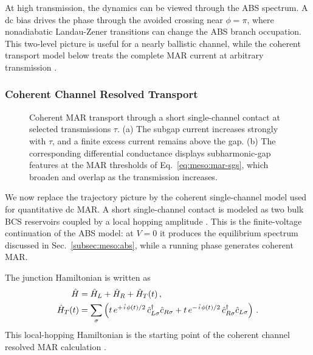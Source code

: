         At high transmission, the dynamics can be viewed through the ABS spectrum. A dc bias drives the phase through the avoided crossing near $\phi=\pi$, where nonadiabatic Landau-Zener transitions can change the ABS branch occupation. This two-level picture is useful for a nearly ballistic channel, while the coherent transport model below treats the complete MAR current at arbitrary transmission \cite{averin_ac_1995}.

        \subsubsection*{Coherent Channel Resolved Transport}

            \begin{figure}[t]
                \centering
                \hfill
                \caption{
                    Coherent MAR transport through a short single-channel contact at selected transmissions $\tau$.
                    (a) The subgap current increases strongly with $\tau$, and a finite excess current remains above the gap.
                    (b) The corresponding differential conductance displays subharmonic-gap features at the MAR thresholds of Eq.~\eqref{eq:meso:mar-sgs}, which broaden and overlap as the transmission increases.
                    }
                \label{fig:meso:mar-ha}
            \end{figure}

            We now replace the trajectory picture by the coherent single-channel model used for quantitative dc MAR. A short single-channel contact is modeled as two bulk BCS reservoirs coupled by a local hopping amplitude \cite{cuevas_hamiltonian_1996}. This is the finite-voltage continuation of the ABS model: at $V=0$ it produces the equilibrium spectrum discussed in Sec.~\ref{subsec:meso:abs}, while a running phase generates coherent MAR.

            The junction Hamiltonian is written as
            \begin{align}
                \hat{H} &= \hat{H}_L + \hat{H}_R + \hat{H}_T(t)\,,\\
                \hat{H}_T(t) &= \sum_\sigma \left( t\,e^{+\ima \phi(t)/2}\,\hat{c}^\dagger_{L\sigma}\hat{c}_{R\sigma}
                + t\,e^{-\ima \phi(t)/2}\,\hat{c}^\dagger_{R\sigma}\hat{c}_{L\sigma}\right)\,.
            \end{align}
            This local-hopping Hamiltonian is the starting point of the coherent channel resolved MAR calculation \cite{cuevas_hamiltonian_1996}.

